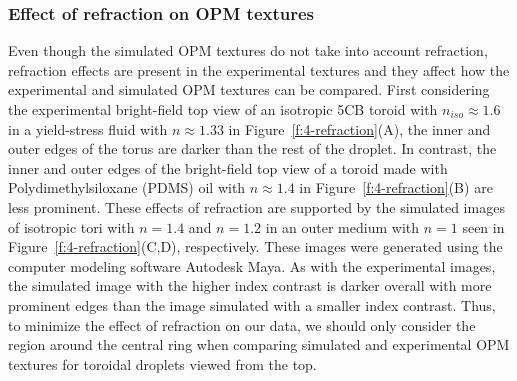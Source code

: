 \subsubsection{Effect of refraction on OPM textures}
Even though the simulated OPM textures do not take into account refraction, refraction effects are present in the experimental textures and they affect how the experimental and simulated OPM textures can be compared.
First considering the experimental bright-field top view of an isotropic 5CB toroid with $n_{iso} \approx 1.6 $ in a yield-stress fluid with $n \approx 1.33$ in Figure~\ref{f:4-refraction}(A), the inner and outer edges of the torus are darker than the rest of the droplet.
In contrast, the inner and outer edges of the bright-field top view of a toroid made with Polydimethylsiloxane (PDMS) oil with $n \approx 1.4$ in Figure~\ref{f:4-refraction}(B) are less prominent.
These effects of refraction are supported by the simulated images of isotropic tori with $n = 1.4$ and $n = 1.2$ in an outer medium with $n=1$ seen in Figure~\ref{f:4-refraction}(C,D), respectively.
These images were generated using the computer modeling software Autodesk Maya.
As with the experimental images, the simulated image with the higher index contrast is darker overall with more prominent edges than the image simulated with a smaller index contrast.
Thus, to minimize the effect of refraction on our data, we should only consider the region around the central ring when comparing simulated and experimental OPM textures for toroidal droplets viewed from the top.

